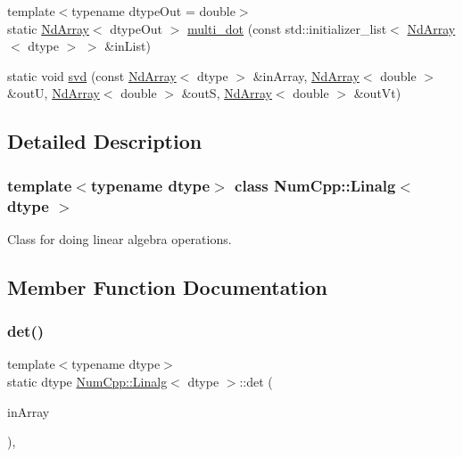 \begin{DoxyCompactItemize}
\item 
{\footnotesize template$<$typename dtype\+Out  = double$>$ }\\static \mbox{\hyperlink{class_num_cpp_1_1_nd_array}{Nd\+Array}}$<$ dtype\+Out $>$ \mbox{\hyperlink{class_num_cpp_1_1_linalg_ac8a5b85861915e24241b5ab4629572c5}{multi\+\_\+dot}} (const std\+::initializer\+\_\+list$<$ \mbox{\hyperlink{class_num_cpp_1_1_nd_array}{Nd\+Array}}$<$ dtype $>$ $>$ \&in\+List)
\item 
static void \mbox{\hyperlink{class_num_cpp_1_1_linalg_a83adbdf05319bb6be6ea3729b3b1c93e}{svd}} (const \mbox{\hyperlink{class_num_cpp_1_1_nd_array}{Nd\+Array}}$<$ dtype $>$ \&in\+Array, \mbox{\hyperlink{class_num_cpp_1_1_nd_array}{Nd\+Array}}$<$ double $>$ \&outU, \mbox{\hyperlink{class_num_cpp_1_1_nd_array}{Nd\+Array}}$<$ double $>$ \&outS, \mbox{\hyperlink{class_num_cpp_1_1_nd_array}{Nd\+Array}}$<$ double $>$ \&out\+Vt)
\end{DoxyCompactItemize}


\subsection{Detailed Description}
\subsubsection*{template$<$typename dtype$>$\newline
class Num\+Cpp\+::\+Linalg$<$ dtype $>$}

Class for doing linear algebra operations. 

\subsection{Member Function Documentation}
\mbox{\label{class_num_cpp_1_1_linalg_ad6b31282e14b4d7428292c06dc96e812}} 
\subsubsection{\texorpdfstring{det()}{det()}}
{\footnotesize\ttfamily template$<$typename dtype$>$ \\
static dtype \mbox{\hyperlink{class_num_cpp_1_1_linalg}{Num\+Cpp\+::\+Linalg}}$<$ dtype $>$\+::det (\begin{DoxyParamCaption}\item[{const \mbox{\hyperlink{class_num_cpp_1_1_nd_array}{Nd\+Array}}$<$ dtype $>$ \&}]{in\+Array }\end{DoxyParamCaption})\hspace{0.3cm}{\ttfamily [inline]}, {\ttfamily [static]}}

